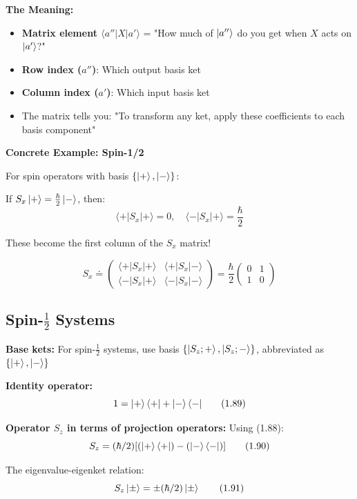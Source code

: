 \documentclass[11pt,a4paper]{article}
\begin{document}
\textbf{The Meaning:}
\begin{itemize}
\item \textbf{Matrix element $\langle a''|X|a'\rangle$} = "How much of $\ket{a''}$ do you get when $X$ acts on $\ket{a'}$?"
\item \textbf{Row index ($a''$)}: Which output basis ket
\item \textbf{Column index ($a'$)}: Which input basis ket
\item The matrix tells you: "To transform any ket, apply these coefficients to each basis component"
\end{itemize}

\textbf{Concrete Example: Spin-1/2}

For spin operators with basis $\{\ket{+}, \ket{-}\}$:

If $S_x\ket{+} = \frac{\hbar}{2}\ket{-}$, then:
$$\langle +|S_x|+\rangle = 0, \quad \langle -|S_x|+\rangle = \frac{\hbar}{2}$$

These become the first column of the $S_x$ matrix!

$$S_x \doteq \begin{pmatrix}
\langle +|S_x|+\rangle & \langle +|S_x|-\rangle \\
\langle -|S_x|+\rangle & \langle -|S_x|-\rangle
\end{pmatrix} = \frac{\hbar}{2}\begin{pmatrix}
0 & 1 \\
1 & 0
\end{pmatrix}$$

\subsection{Spin-$\frac{1}{2}$ Systems}

\textbf{Base kets:} For spin-$\frac{1}{2}$ systems, use basis $\{\ket{S_z; +}, \ket{S_z; -}\}$, abbreviated as $\{\ket{+}, \ket{-}\}$

\textbf{Identity operator:}
\begin{equation}
1 = \ket{+}\langle +| + \ket{-}\langle -|
\tag{1.89}
\end{equation}

\textbf{Operator $S_z$ in terms of projection operators:}
Using (1.88):
\begin{equation}
S_z = (\hbar/2)[(\ket{+}\langle +|) - (\ket{-}\langle -|)]
\tag{1.90}
\end{equation}

The eigenvalue-eigenket relation:
\begin{equation}
S_z\ket{\pm} = \pm(\hbar/2)\ket{\pm}
\tag{1.91}
\end{equation}
\end{document}
